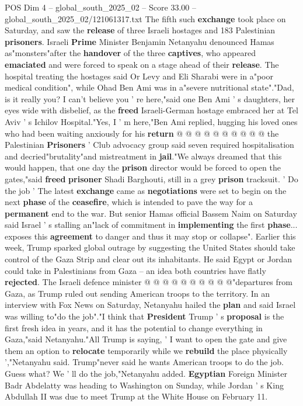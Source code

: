 \begin{textsample}{POS Dim 4 – global\_south\_2025\_02 – Score 33.00 – global\_south\_2025\_02/121061317.txt}
The fifth such \textbf{exchange} took place on Saturday, and saw the \textbf{release} of three Israeli hostages and 183 Palestinian \textbf{prisoners}.
Israeli \textbf{Prime} Minister Benjamin Netanyahu denounced Hamas as"monsters"after the \textbf{handover} of the three \textbf{captives}, who appeared \textbf{emaciated} and were forced to speak on a stage ahead of their \textbf{release}.
The hospital treating the hostages said Or Levy and Eli Sharabi were in a"poor medical condition", while Ohad Ben Ami was in a"severe nutritional state"."Dad, is it really you?
I can't believe you ' re here,"said one Ben Ami ' s daughters, her eyes wide with disbelief, as the \textbf{freed} Israeli-German hostage embraced her at Tel Aviv ' s Ichilov Hospital."Yes, I ' m here,"Ben Ami replied, hugging his loved ones who had been waiting anxiously for his \textbf{return} @ @ @ @ @ @ @ @ @ @ the Palestinian \textbf{Prisoners} ' Club advocacy group said seven required hospitalisation and decried"brutality"and mistreatment in \textbf{jail}."We always dreamed that this would happen, that one day the \textbf{prison} director would be forced to open the gates,"said \textbf{freed} \textbf{prisoner} Shadi Barghouti, still in a grey \textbf{prison} tracksuit. ' Do the job ' The latest \textbf{exchange} came as \textbf{negotiations} were set to begin on the next \textbf{phase} of the \textbf{ceasefire}, which is intended to pave the way for a \textbf{permanent} end to the war.
But senior Hamas official Bassem Naim on Saturday said Israel ' s stalling an"lack of commitment in \textbf{implementing} the first \textbf{phase}... exposes this \textbf{agreement} to danger and thus it may stop or collapse".
Earlier this week, Trump sparked global outrage by suggesting the United States should take control of the Gaza Strip and clear out its inhabitants.
He said Egypt or Jordan could take in Palestinians from Gaza -- an idea both countries have flatly \textbf{rejected}.
The Israeli defence minister @ @ @ @ @ @ @ @ @ @"departures from Gaza, as Trump ruled out sending American troops to the territory.
In an interview with Fox News on Saturday, Netanyahu hailed the \textbf{plan} and said Israel was willing to"do the job"."I think that \textbf{President} Trump ' s \textbf{proposal} is the first fresh idea in years, and it has the potential to change everything in Gaza,"said Netanyahu."All Trump is saying, ' I want to open the gate and give them an option to \textbf{relocate} temporarily while we \textbf{rebuild} the place physically ',"Netanyahu said.
Trump"never said he wants American troops to do the job.
Guess what?
We ' ll do the job,"Netanyahu added. \textbf{Egyptian} Foreign Minister Badr Abdelatty was heading to Washington on Sunday, while Jordan ' s King Abdullah II was due to meet Trump at the White House on February 11.

\end{textsample}
